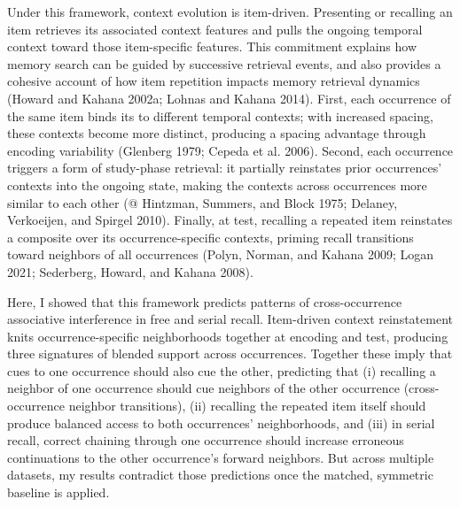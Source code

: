 \documentclass[
  letterpaper,
  11pt,
  english,
  singlespacing,
  headsepline]{MastersDoctoralThesis}
\begin{document}
Under this framework, context evolution is item-driven. Presenting or
recalling an item retrieves its associated context features and pulls
the ongoing temporal context toward those item-specific features. This
commitment explains how memory search can be guided by successive
retrieval events, and also provides a cohesive account of how item
repetition impacts memory retrieval dynamics (Howard and Kahana 2002a;
Lohnas and Kahana 2014). First, each occurrence of the same item binds
its to different temporal contexts; with increased spacing, these
contexts become more distinct, producing a spacing advantage through
encoding variability (Glenberg 1979; Cepeda et al. 2006). Second, each
occurrence triggers a form of study-phase retrieval: it partially
reinstates prior occurrences' contexts into the ongoing state, making
the contexts across occurrences more similar to each other (@ Hintzman,
Summers, and Block 1975; Delaney, Verkoeijen, and Spirgel 2010).
Finally, at test, recalling a repeated item reinstates a composite over
its occurrence-specific contexts, priming recall transitions toward
neighbors of all occurrences (Polyn, Norman, and Kahana 2009; Logan
2021; Sederberg, Howard, and Kahana 2008).

Here, I showed that this framework predicts patterns of cross-occurrence
associative interference in free and serial recall. Item-driven context
reinstatement knits occurrence-specific neighborhoods together at
encoding and test, producing three signatures of blended support across
occurrences. Together these imply that cues to one occurrence should
also cue the other, predicting that (i) recalling a neighbor of one
occurrence should cue neighbors of the other occurrence
(cross-occurrence neighbor transitions), (ii) recalling the repeated
item itself should produce balanced access to both occurrences'
neighborhoods, and (iii) in serial recall, correct chaining through one
occurrence should increase erroneous continuations to the other
occurrence's forward neighbors. But across multiple datasets, my results
contradict those predictions once the matched, symmetric baseline is
applied.
\end{document}
